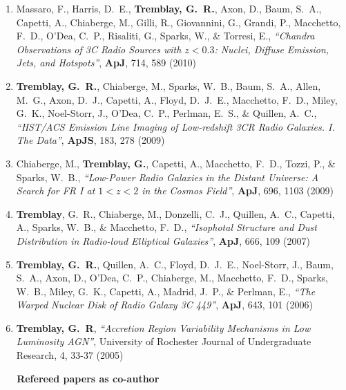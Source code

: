 \documentclass[11pt]{article}
\begin{document}
\begin{enumerate}
\item Massaro, F.,  Harris, D.~E., \textbf{Tremblay, G.~R.}, Axon, D.,
Baum, S.~A., Capetti, A., Chiaberge, M., Gilli, R.,
Giovannini, G., Grandi, P., Macchetto, F.~D., O'Dea, C.~P., Risaliti, G.,
Sparks, W.,
\& Torresi, E., \textit{``Chandra Observations of 3C Radio Sources with $z < 0.3$: Nuclei, Diffuse Emission, Jets, and Hotspots''}, \textbf{ApJ}, 714,  589 (2010)




\item \textbf{Tremblay, G.~R.}, Chiaberge, M., Sparks, W.~B., Baum, S.~A., Allen,
M.~G., Axon, D.~J., Capetti, A., Floyd, D.~J.~E., Macchetto, F.~D., Miley,
G.~K., Noel-Storr, J., O'Dea, C.~P., Perlman, E.~S.,
\& Quillen, A.~C.,  \textit{``HST/ACS Emission Line Imaging of Low-redshift 3CR Radio Galaxies. I. The Data''}, \textbf{ApJS}, 183,  278 (2009)



\item Chiaberge, M., \textbf{Tremblay, G.}, Capetti, A., Macchetto, F.~D., Tozzi, P.,
\& Sparks, W.~B.,  \textit{``Low-Power Radio Galaxies in the Distant Universe: A Search for FR I at $1< z < 2$ in the Cosmos Field''}, \textbf{ApJ}, 696,  1103 (2009)



\item \textbf{Tremblay}, G.~R., Chiaberge, M., Donzelli, C.~J., Quillen, A.~C.,
Capetti, A., Sparks, W.~B.,
\& Macchetto, F.~D., \textit{``Isophotal Structure and Dust Distribution in Radio-loud Elliptical Galaxies''}, \textbf{ApJ}, 666,  109 (2007)

\item \textbf{Tremblay, G.~R.}, Quillen, A.~C., Floyd, D.~J.~E., Noel-Storr, J., Baum,
S.~A., Axon, D., O'Dea, C.~P., Chiaberge, M., Macchetto, F.~D., Sparks,
W.~B., Miley, G.~K., Capetti, A., Madrid, J.~P.,
\& Perlman, E.,   \textit{``The Warped Nuclear Disk of Radio Galaxy 3C 449''}, \textbf{ApJ}, 643,  101 (2006)


\item \textbf{Tremblay, G.~R}, \textit{``Accretion Region Variability Mechanisms in Low Luminosity AGN''}, University of Rochester Journal of Undergraduate Research, 4, 33-37 (2005)

\end{enumerate}

\vspace{4mm}

\noindent \textbf{~~~Refereed papers as co-author}
\end{document}
